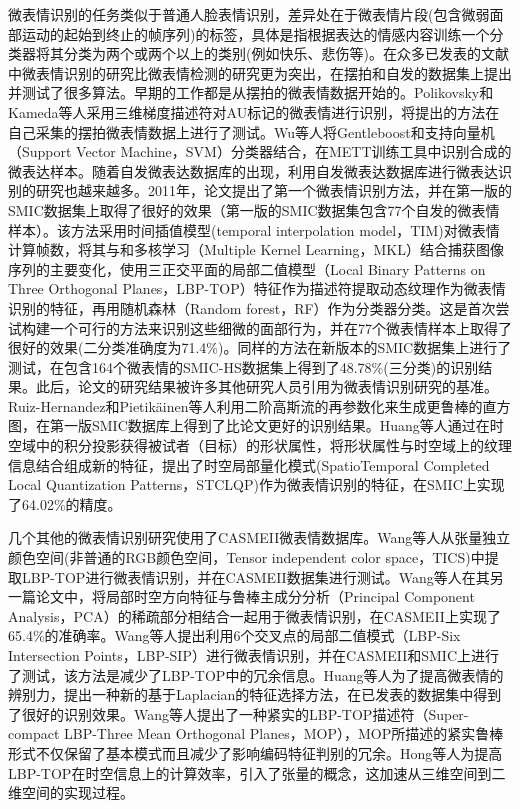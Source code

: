微表情识别的任务类似于普通人脸表情识别，差异处在于微表情片段(包含微弱面部运动的起始到终止的帧序列)的标签，具体是指根据表达的情感内容训练一个分类器将其分类为两个或两个以上的类别(例如快乐、悲伤等)。在众多已发表的文献中微表情识别的研究比微表情检测的研究更为突出，在摆拍和自发的数据集上提出并测试了很多算法。早期的工作都是从摆拍的微表情数据开始的。Polikovsky和Kameda等人采用三维梯度描述符对AU标记的微表情进行识别，将提出的方法在自己采集的摆拍微表情数据上进行了测试\citep{Polikovsky2013Facial}。Wu等人将Gentleboost和支持向量机（Support Vector Machine，SVM）分类器结合，在METT训练工具中识别合成的微表达样本。随着自发微表达数据库的出现，利用自发微表达数据库进行微表达识别的研究也越来越多。2011年，论文提出了第一个微表情识别方法，并在第一版的SMIC数据集上取得了很好的效果（第一版的SMIC数据集包含77个自发的微表情样本）。该方法采用时间插值模型(temporal interpolation model，TIM)对微表情计算帧数，将其与和多核学习（Multiple Kernel Learning，MKL）结合捕获图像序列的主要变化，使用三正交平面的局部二值模型（Local Binary Patterns on Three Orthogonal Planes，LBP-TOP）特征作为描述符提取动态纹理作为微表情识别的特征，再用随机森林（Random forest，RF）作为分类器分类。这是首次尝试构建一个可行的方法来识别这些细微的面部行为，并在77个微表情样本上取得了很好的效果(二分类准确度为71.4\%)。同样的方法在新版本的SMIC数据集上进行了测试，在包含164个微表情的SMIC-HS数据集上得到了48.78\%(三分类)的识别结果。此后，论文的研究结果被许多其他研究人员引用为微表情识别研究的基准。Ruiz-Hernandez和Pietikäinen等人利用二阶高斯流的再参数化来生成更鲁棒的直方图，在第一版SMIC数据库上得到了比论文更好的识别结果\citep{ruiz2013encoding}。Huang等人通过在时空域中的积分投影获得被试者（目标）的形状属性，将形状属性与时空域上的纹理信息结合组成新的特征，提出了时空局部量化模式(SpatioTemporal Completed Local Quantization Patterns，STCLQP)作为微表情识别的特征，在SMIC上实现了64.02\%的精度\citep{Huang2015Facial}。

几个其他的微表情识别研究使用了CASMEII微表情数据库。Wang等人从张量独立颜色空间(非普通的RGB颜色空间，Tensor independent color space，TICS)中提取LBP-TOP进行微表情识别，并在CASMEII数据集进行测试\citep{wang2014micro2}。Wang等人在其另一篇论文中，将局部时空方向特征与鲁棒主成分分析（Principal Component Analysis，PCA）的稀疏部分相结合一起用于微表情识别，在CASMEII上实现了65.4\%的准确率\citep{wang2014micro}。Wang等人提出利用6个交叉点的局部二值模式（LBP-Six Intersection Points，LBP-SIP）进行微表情识别，并在CASMEII和SMIC上进行了测试，该方法是减少了LBP-TOP中的冗余信息\citep{wang2014lbp}。Huang等人为了提高微表情的辨别力，提出一种新的基于Laplacian的特征选择方法，在已发表的数据集中得到了很好的识别效果\citep{xiaohua2017discriminative}。Wang等人提出了一种紧实的LBP-TOP描述符（Super-compact LBP-Three Mean Orthogonal Planes，MOP），MOP所描述的紧实鲁棒形式不仅保留了基本模式而且减少了影响编码特征判别的冗余\citep{wang2015efficient}。Hong等人为提高LBP-TOP在时空信息上的计算效率，引入了张量的概念，这加速从三维空间到二维空间的实现过程\citep{FLBPTOP_2016}。

